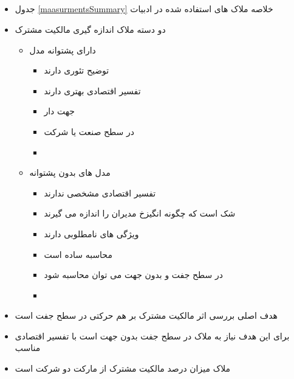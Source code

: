 \documentclass[12pt, a4paper]{article}
\begin{document}
  
\subsection{}

\begin{itemize}
	\item 
	جدول 
	\ref{maasurmentsSummary}
	خلاصه ملاک های استفاده شده در ادبیات
	\item 
	دو دسته ملاک اندازه گیری مالکیت مشترک
	\begin{itemize}
		\item 
		دارای پشتوانه مدل
		\begin{itemize}
			\item 
			توضیح تئوری دارند
			\item 
			تفسیر اقتصادی بهتری دارند
			\item 
			جهت دار
			\item
			در سطح صنعت یا شرکت
			\item
		\end{itemize}
		\item 
	مدل های بدون پشتوانه
	\begin{itemize}
		\item 
		تفسیر اقتصادی مشخصی ندارند
		\item 
		شک است که چگونه انگیزخ مدیران را اندازه می گیرند
		\item 
		ویژگی های نامطلوبی دارند 
		\item
		محاسبه ساده است
		\item
		در سطح جفت و بدون جهت می توان محاسبه شود
		
		\item
	\end{itemize}
	
		
	\end{itemize}
	
	\item 
	هدف اصلی بررسی اثر مالکیت مشترک بر هم حرکتی در سطح جفت است
	
	\item 
	برای این هدف نیاز به ملاک در سطح جفت بدون جهت است با تفسیر اقتصادی مناسب
	
	\item 
	ملاک
	\cite{AntonPolk}
	میزان درصد مالکیت مشترک از مارکت دو شرکت است
	

\end{itemize}
\end{document}
